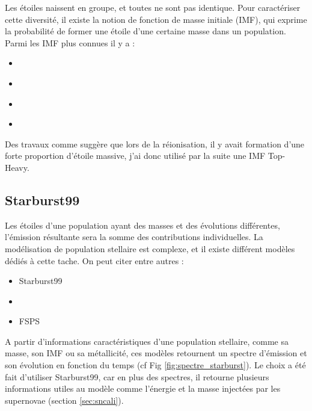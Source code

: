 Les étoiles naissent en groupe, et toutes ne sont pas identique.
Pour caractériser cette diversité, il existe la notion de fonction de masse initiale (\ac{IMF}), qui exprime la probabilité de former une étoile d'une certaine masse dans un population.
Parmi les \ac{IMF} plus connues il y a :

\begin{itemize}
\item \cite{1955ApJ...121..161S}
\item \cite{1979ApJS...41..513M}
\item \cite{2001MNRAS.322..231K}
\item \cite{2003PASP..115..763C}
\end{itemize}


Des travaux comme \cite{2003MNRAS.344L...7C} suggère que lors de la réionisation, il y avait formation d'une forte proportion d'étoile massive, j'ai donc utilisé par la suite une \ac{IMF} Top-Heavy.


\subsection{Starburst99}
\label{sec:staburst}

Les étoiles d'une population ayant des masses et des évolutions différentes, l'émission résultante sera la somme des contributions individuelles.
La modélisation de population stellaire est complexe, et il existe différent modèles dédiés à cette tache.
On peut citer entre autres :

\begin{itemize}
\item Starburst99 \cite{leitherer_starburst99:_1999} 
\item \cite{2003MNRAS.344.1000B}
\item FSPS \cite{2009ApJ...699..486C}
\end{itemize}

A partir d'informations caractéristiques d'une population stellaire, comme sa masse, son \ac{IMF} ou sa métallicité, ces modèles retournent un spectre d'émission et son évolution en fonction du temps (cf Fig \ref{fig:spectre_starburst}).
Le choix a été fait d'utiliser Starburst99, car en plus des spectres, il retourne plusieurs informations utiles au modèle comme l'énergie et la masse injectées par les supernovae (section \ref{sec:sncali}).

